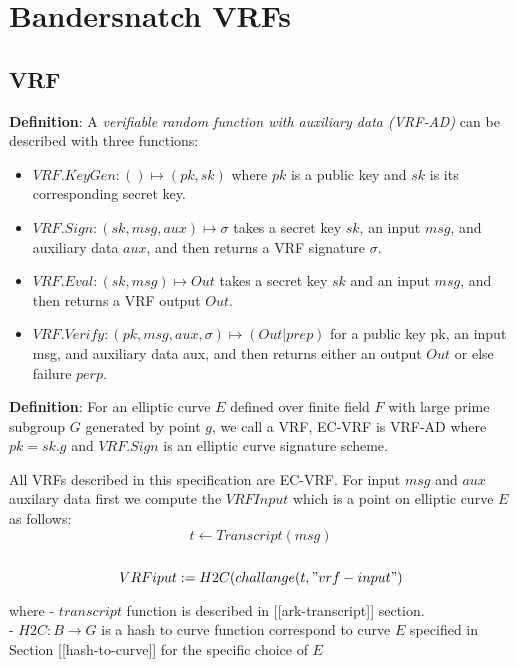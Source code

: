 \documentclass[
]{article}
\author{}
\date{}
\providecommand{\tightlist}{%
  \setlength{\itemsep}{0pt}\setlength{\parskip}{0pt}}
\begin{document}
\hypertarget{bandersnatch-vrfs}{%
\section{Bandersnatch VRFs}\label{bandersnatch-vrfs}}

\hypertarget{vrf}{%
\subsection{VRF}\label{vrf}}

\textbf{Definition}: A \emph{verifiable random function with auxiliary
data (VRF-AD)} can be described with three functions:

\begin{itemize}
\tightlist
\item
  \(VRF.KeyGen: () \mapsto (pk,sk)\) where \(pk\) is a public key and
  \(sk\) is its corresponding secret key.
\item
  \(VRF.Sign : (sk,msg,aux) \mapsto \sigma\) takes a secret key \(sk\),
  an input \(msg\), and auxiliary data \(aux\), and then returns a VRF
  signature \(\sigma\).
\item
  \(VRF.Eval : (sk, msg) \mapsto Out\) takes a secret key \(sk\) and an
  input \(msg\), and then returns a VRF output \(Out\).
\item
  \(VRF.Verify: (pk,msg,aux,\sigma)\mapsto (Out|prep)\) for a public key
  pk, an input msg, and auxiliary data aux, and then returns either an
  output \(Out\) or else failure \(perp\).
\end{itemize}

\textbf{Definition}: For an elliptic curve \(E\) defined over finite
field \(F\) with large prime subgroup \(G\) generated by point \(g\), we
call a VRF, EC-VRF is VRF-AD where \(pk = sk.g\) and \(VRF.Sign\) is an
elliptic curve signature scheme.

All VRFs described in this specification are EC-VRF. For input \(msg\)
and \(aux\) auxilary data first we compute the \(VRFInput\) which is a
point on elliptic curve \(E\) as follows:
\[ t \leftarrow Transcript(msg) \]\\
\[ VRFiput := H2C(challange(t, "vrf-input") \]

where - \(transcript\) function is described in
{[}{[}ark-transcript{]}{]} section.\\
- \(H2C: B \rightarrow G\) is a hash to curve function correspond to
curve \(E\) specified in Section {[}{[}hash-to-curve{]}{]} for the
specific choice of \(E\)
\end{document}
